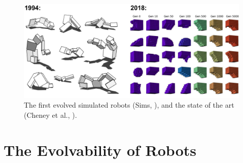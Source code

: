 \begin{figure}
\centering
\includegraphics[width=\linewidth]{fig/virtualevorobo.pdf}
\caption{\label{fig:sims}%
The first evolved simulated robots (Sims, \cite{sims1994evolving}), and the state of the art (Cheney et al., \cite{cheney2018scalable}).
}
\end{figure}








\section{The Evolvability of Robots}


